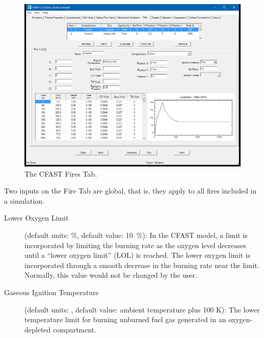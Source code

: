 \begin{figure}[h!]
\begin{center}
\includegraphics[width=6.5in]{FIGURES/Fire_Tab}
\caption[The CFAST Fires Tab]{The CFAST Fires Tab.}
\end{center}
\end{figure}

Two inputs on the Fire Tab are global, that is, they apply to all fires included in a simulation.
\begin{description}
\item[Lower Oxygen Limit] (default units: \%, default value: 10~\%):  In the CFAST model, a limit is incorporated by limiting the burning rate as the oxygen level decreases until a ``lower oxygen limit'' (LOL) is reached. The lower oxygen limit is incorporated through a smooth decrease in the burning rate near the limit. Normally, this value would not be changed by the user.
\item[Gaseous Ignition Temperature] (default units: \degc, default value: ambient temperature plus 100 K): The lower temperature limit for burning unburned fuel gas generated in an oxygen-depleted compartment.
\end{description}




